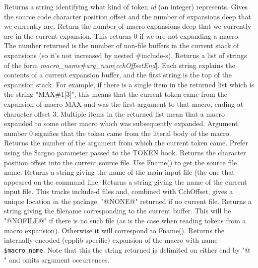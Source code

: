 Returns a string identifying what kind of token \textit{id} (an integer) represents.
Gives the source code character position offset and the number of expansions
deep that we currently are.
Return the number of macro expansions deep that we currently are in
the current expansion.  This returns 0 if we are not expanding a macro.
The number returned is the number of non-file buffers in the current
stack of expansions (so it's not increased by nested \#include-s).
Returns a list of strings of the form 
\textit{macro\_\-name}\#\textit{arg\_\-num}[\textit{cchOffsetEnd}]. 
Each string explains the contents of a current expansion buffer,
and the first string is the top of the expansion stack.
For example, if there is a single item in the returned list
which is the string "MAX\#1[3]", this means that the current
token came from the expansion of macro MAX and was the first argument
to that macro, ending at character offset 3.  Multiple items
in the returned list mean that a macro expanded to some other
macro which was subsequently expanded.  Argument number 0 signifies
that the token came from the literal body of the macro.
Returns the number of the argument from which the current token came.
Prefer using the \$argno parameter passed to the TOKEN hook.
Returns the character position offset into the current source file.
Use Fname() to get the source file name.
Returns a string giving the name of the main input file (the one
that appeared on the command line.
Returns a string giving the name of the current input file.  This
tracks include-d files and, combined with CchOffset, gives a
unique location in the package.  "@NONE@" returned if no current file.
Returns a string giving the filename corresponding to the current
buffer.  This will be "@NOFILE@" if there is no such file (as is
the case when reading tokens from a macro expansion).
Otherwise it will correspond to Fname().
Returns the internally-encoded (cpplib-specific) expansion of
the macro with name \texttt{\$macro\_\-name}.  Note that this the string
returned is delimited on either end by "@ " and omits argument occurrences.

